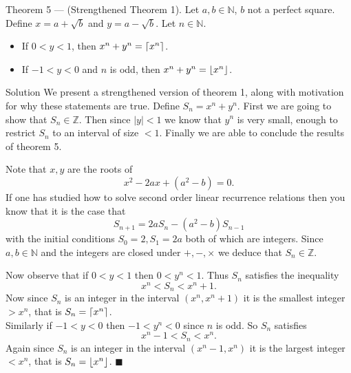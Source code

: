 \documentclass{article}
\begin{document}
\begin{problem}{Theorem 5 --- (Strengthened Theorem 1).}
Let $a,b \in \mathbb{N}$, $b$ not a perfect square.
Define $x = a + \sqrt{b}$ and $y = a - \sqrt{b}$.
Let $n \in \mathbb{N}$.
\begin{itemize}
\item If $0 < y < 1$, then $x^n + y^n = \left\lceil x^n \right\rceil$.
\item If $-1 < y < 0$ and $n$ is odd, then $x^n + y^n = \left\lfloor x^n \right\rfloor$.
\end{itemize}
\end{problem}

\begin{solution}{Solution}
We present a strengthened version of theorem 1, along with motivation
for why these statements are true. Define $S_n = x^n + y^n$.
First we are going to show that $S_n \in \mathbb{Z}$. Then since
$|y| < 1$ we know that $y^n$ is very small, enough to restrict $S_n$ to an
interval of size $< 1$. Finally we are able to conclude the results of
theorem 5.
\vspace{0.2cm}

Note that $x,y$ are the roots of
$$
x^2 - 2ax + (a^2 - b) = 0.
$$
If one has studied how to solve second order linear recurrence relations
then you know that it is the case that
$$
S_{n+1} = 2a S_n - (a^2 - b) S_{n-1}
$$
with the initial conditions $S_0 = 2, S_1 = 2a$ both of which are integers.
Since $a,b\in \mathbb{N}$ and the integers are closed under $+, -, \times$
we deduce that $S_n \in \mathbb{Z}$. \\

{
\color{gray}
\hline
}
\vspace{0.2cm}

Now observe that if $0 < y < 1$ then $0 < y^n < 1$. Thus $S_n$ satisfies
the inequality
$$
x^n < S_n < x^n + 1.
$$
Now since $S_n$ is an integer in the interval $(x^n, x^n + 1)$ it is
the smallest integer $ > x^n$, that is $S_n = \left\lceil x^n \right\rceil$. \\

Similarly if $-1 < y < 0$ then $-1 < y^n < 0$ since $n$ is odd. So
$S_n$ satisfies
$$
x^n - 1 < S_n < x^n.
$$
Again since $S_n$ is an integer in the interval $(x^n - 1, x^n)$ it is the
largest integer $< x^n$, that is $S_n = \left\lfloor x^n \right\rfloor$. $\blacksquare$
\end{solution}
\newpage
\end{document}

